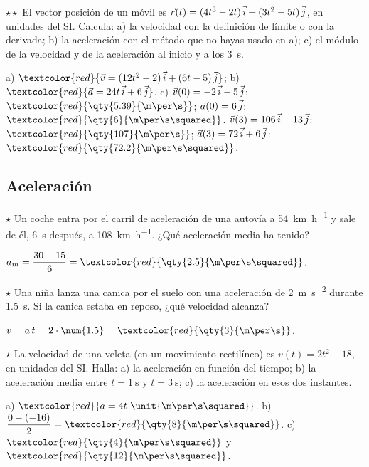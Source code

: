 \begin{exercise}
    \(\star\star\) El vector posición de un móvil es \(\vec r(t) = (4t^3 - 2t)\,\vec{i} + (3t^2 - 5t)\,\vec{j}\), en unidades del SI.
    Calcula: a) la velocidad con la definición de límite o con la derivada; b) la aceleración con el método que no hayas usado en
    a); c) el módulo de la velocidad y de la aceleración al inicio y a los \qty{3}{\s}.
    \begin{solu}
        a) \(\textcolor{red}{\vec v = (12t^2 - 2)\,\ivec + (6t - 5)\,\jvec}\); b) \(\textcolor{red}{\vec a = 24t\,\ivec + 6\,\jvec}\).
        c) \(\vec v(0) = -2\,\vec{i} - 5\,\vec{j}\): \(\textcolor{red}{\qty{5.39}{\m\per\s}}\); \(\vec a(0) = 6\,\vec{j}\):
        \(\textcolor{red}{\qty{6}{\m\per\s\squared}}\). \(\vec v(3) = 106\,\vec{i} + 13\,\vec{j}\): \(\textcolor{red}{\qty{107}{\m\per\s}}\);
        \(\vec a(3) = 72\,\vec{i} + 6\,\vec{j}\): \(\textcolor{red}{\qty{72.2}{\m\per\s\squared}}\).
    \end{solu}
\end{exercise}

\subsection{Aceleración}

\begin{exercise}
    \(\star\) Un coche entra por el carril de aceleración de una autovía a \qty{54}{\km\per\hour} y sale de él, \qty{6}{\s}
    después, a \qty{108}{\km\per\hour}. ¿Qué aceleración media ha tenido?
    \begin{solu}
        \(a_m = \dfrac{30 - 15}{6} = \textcolor{red}{\qty{2.5}{\m\per\s\squared}}\).
    \end{solu}
\end{exercise}

\begin{exercise}
    \(\star\) Una niña lanza una canica por el suelo con una aceleración de \qty{2}{\m\per\s\squared} durante \qty{1.5}{\s}. Si la
    canica estaba en reposo, ¿qué velocidad alcanza?
    \begin{solu}
        \(v = a\,t = 2 \cdot \num{1.5} = \textcolor{red}{\qty{3}{\m\per\s}}\).
    \end{solu}
\end{exercise}

\begin{exercise}
    \(\star\) La velocidad de una veleta (en un movimiento rectilíneo) es \(v(t) = 2t^2 - 18\), en unidades del SI. Halla:
    a) la aceleración en función del tiempo; b) la aceleración media entre \(t = \qty{1}{\s}\) y \(t = \qty{3}{\s}\); c) la
    aceleración en esos dos instantes.
    \begin{solu}
        a) \(\textcolor{red}{a = 4t~\unit{\m\per\s\squared}}\). b) \(\dfrac{0 - (-16)}{2} = \textcolor{red}{\qty{8}{\m\per\s\squared}}\).
        c) \(\textcolor{red}{\qty{4}{\m\per\s\squared}}\) y \(\textcolor{red}{\qty{12}{\m\per\s\squared}}\).
    \end{solu}
\end{exercise}

